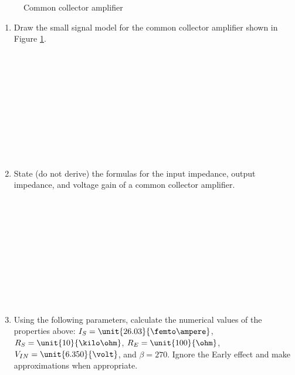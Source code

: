 \documentclass{article}
\begin{document}
\thispagestyle{plain}

\name

\begin{figure}[!htb]
  
  \centerline{\box\graph}
  \caption{Common collector amplifier}
  \label{ccamp}
\end{figure}

\begin{enumerate}

	\item Draw the small signal model for the common collector amplifier shown in Figure \ref{ccamp}.
	~\\~\\~\\~\\~\\~\\~\\~\\~\\~\\~\\
	\item State (do not derive) the formulas for the input impedance, output impedance, and voltage gain of a common collector amplifier.
	~\\~\\~\\~\\~\\~\\~\\~\\~\\~\\~\\
	\item Using the following parameters, calculate the numerical values of the properties above: $I_{S} = \unit{26.03}{\femto\ampere}$, $R_{S} = \unit{10}{\kilo\ohm}$, $R_{E} = \unit{100}{\ohm}$, $V_{IN} = \unit{6.350}{\volt}$, and $\beta = 270$. Ignore the Early effect and make approximations when appropriate.
	~\\~\\~\\~\\~\\~\\~\\~\\~\\~\\~\\

\end{enumerate}
\end{document}
